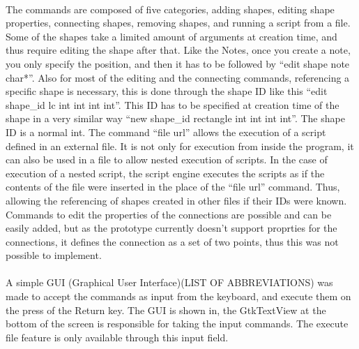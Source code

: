 \paragraph{} 
The commands are composed of five categories, adding shapes, editing shape properties, connecting shapes, removing shapes, and running a script from a file.
Some of the shapes take a limited amount of arguments at creation time, and thus require editing the shape after that. Like the Notes, once you create a note, you only specify the position, and then it has to be followed by ``edit shape note char*''. Also for most of the editing and the connecting commands, referencing a specific shape is necessary, this is done through the shape ID like this ``edit shape\_id lc int int int int''. This ID has to be specified at creation time of the shape in a very similar way ``new shape\_id rectangle int int int int''. The shape ID is a normal int.
The command ``file url'' allows the execution of a script defined in an external file. It is not only for execution from inside the program, it can also be used in a file to allow nested execution of scripts. In the case of execution of a nested script, the script engine executes the scripts as if the contents of the file were inserted in the place of the ``file url'' command. Thus, allowing the referencing of shapes created in other files if their IDs were known.
Commands to edit the properties of the connections are possible and can be easily added, but as the prototype currently doesn't support proprties for the connections, it defines the connection as a set of two points, thus this was not possible to implement.

\paragraph{}
A simple GUI (Graphical User Interface)(LIST OF ABBREVIATIONS) was made to accept the commands as input from the keyboard, and execute them on the press of the Return key. The GUI is shown in, the GtkTextView at the bottom of the screen is responsible for taking the input commands. The execute file feature is only available through this input field.



